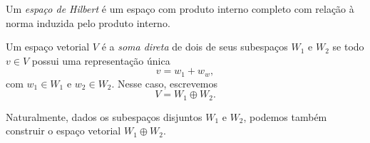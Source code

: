 \begin{defn}
    Um \emph{espaço de Hilbert} é um espaço com produto interno completo com relação à norma induzida pelo produto interno.
\end{defn}

\begin{defn}
    Um espaço vetorial \( V \) é a \emph{soma direta} de dois de seus subespaços \( W_{ 1 } \) e \( W_{ 2 } \) se todo \( v \in V \) possui uma representação única \[
        v = w_{ 1 } + w_{ w }
    ,\]
    com \( w_{ 1 } \in W_{ 1 } \) e \( w_{ 2 } \in W_{ 2 } \).
    Nesse caso, escrevemos \[
        V = W_{ 1 } \oplus W_{ 2 }
    .\]
\end{defn}
\begin{rem}
    Naturalmente, dados os subespaços disjuntos \( W_{ 1 } \) e \( W_{ 2 } \), podemos também construir o espaço vetorial \( W_{ 1 } \oplus W_{ 2 } \).
\end{rem}